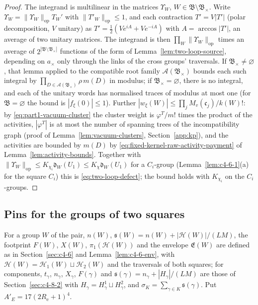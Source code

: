 \begin{proof}
The integrand is multilinear in the matrices $\Upsilon_W$, $W\in\mathfrak B\setminus\mathfrak B_\times$. Write $\Upsilon_W=\|\Upsilon_W\|_{\mathrm{op}}T_W'$ with $\|T'_W\|_{\mathrm{op}}\leq1$, and each contraction $T'=V|T'|$ (polar decomposition, $V$ unitary) as $T'=\frac12(Ve^{iA}+Ve^{-iA})$ with $A=\arccos|T'|$, an average of two unitary matrices. The integrand is then $\prod_W\|\Upsilon_W\|_{\mathrm{op}}$ times an average of $2^{|\mathfrak B\setminus\mathfrak B_\times|}$ functions of the form of Lemma~\ref{lem:two-loop-source}, depending on $a_\times$ only through the links of the cross groups' traversals. If $\mathfrak B_\times\neq\varnothing$, that lemma applied to the compatible root family $\mathcal A(\mathfrak B_\times)$ bounds each such integral by $\prod_{D\in\mathcal A(\mathfrak B_\times)}\rho\,m(D)$ in modulus; if $\mathfrak B_\times=\varnothing$, there is no integral, and each of the unitary words has normalised traces of modulus at most one (for $\mathfrak B=\varnothing$ the bound is $|f_\xi(0)|\leq1$). Further $|w_\xi(W)|\leq\prod_jM_v(\mathfrak c_j)/k(W)!$: by \eqref{eq:part1-vacuum-cluster} the cluster weight is $\varphi^T/m!$ times the product of the activities, $|\varphi^T|$ is at most the number of spanning trees of the incompatibility graph (proof of Lemma~\ref{lem:vacuum-clusters}, Section~\ref{app:kp}), and the activities are bounded by $m(D)$ by \eqref{eq:fixed-kernel-raw-activity-payment} of Lemma~\ref{lem:activity-bounds}. Together with $\|\Upsilon_W\|_{\mathrm{op}}\leq K_{\chi_i}\mathfrak d_W(U_1)\leq K_\chi\mathfrak d_W(U_1)$ for a $C_i$-group (Lemma~\ref{lem:c4-6-1}(a) for the square $C_i$) this is \eqref{eq:two-loop-defect}; the bound holds with $K_{\chi_i}$ on the $C_i$-groups.
\end{proof}

\subsection{Pins for the groups of two squares}\label{sec:two-loops-pins}
For a group $W$ of the pair, $n(W)$, $\mathfrak s(W)=n(W)+|\mathcal H(W)|/(LM)$, the footprint $F(W)$, $X(W)$, $\pi_1(\mathcal H(W))$ and the envelope $\mathfrak E(W)$ are defined as in Section~\ref{sec:c4-6} and Lemma~\ref{lem:c4-6-env}, with $\mathcal H(W)=\mathcal H_1(W)\sqcup\mathcal H_2(W)$ and the traversals of both squares; for components, $t_\gamma$, $n_\gamma$, $X_\gamma$, $F(\gamma)$ and $\mathfrak s(\gamma)=n_\gamma+|H_\gamma|/(LM)$ are those of Section~\ref{sec:c4-8-2} with $H_\gamma=H^1_\gamma\sqcup H^2_\gamma$, and $\sigma_K=\sum_{\gamma\in K}\mathfrak s(\gamma)$. Put $A'_E=17(2R_{\mathrm e}+1)^4$.

